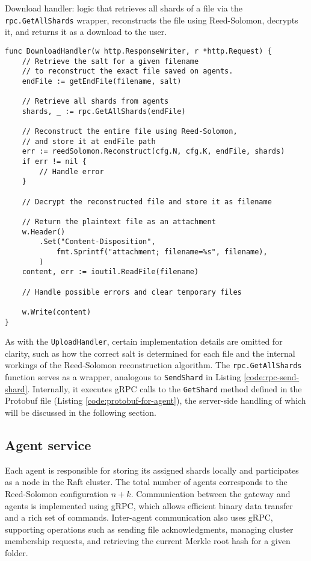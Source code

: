 \begin{listing}
\caption{Download handler: logic that retrieves all shards of a file via the \texttt{rpc.GetAllShards} wrapper, reconstructs the file using Reed-Solomon, decrypts it, and returns it as a download to the user.}
\label{code:download-handler}
\begin{verbatim}
func DownloadHandler(w http.ResponseWriter, r *http.Request) {
    // Retrieve the salt for a given filename 
    // to reconstruct the exact file saved on agents.
    endFile := getEndFile(filename, salt)

    // Retrieve all shards from agents
    shards, _ := rpc.GetAllShards(endFile)

    // Reconstruct the entire file using Reed-Solomon,
    // and store it at endFile path
    err := reedSolomon.Reconstruct(cfg.N, cfg.K, endFile, shards)
    if err != nil {
        // Handle error
    }

    // Decrypt the reconstructed file and store it as filename

    // Return the plaintext file as an attachment
    w.Header()
        .Set("Content-Disposition",
            fmt.Sprintf("attachment; filename=%s", filename),
        )
    content, err := ioutil.ReadFile(filename)

    // Handle possible errors and clear temporary files

    w.Write(content)
}
\end{verbatim}
\end{listing}

As with the \texttt{UploadHandler}, certain implementation details are omitted for clarity, such as how the correct salt is determined for each file and the internal workings of the Reed-Solomon reconstruction algorithm. The \texttt{rpc.GetAllShards} function serves as a wrapper, analogous to \texttt{SendShard} in Listing \ref{code:rpc-send-shard}. Internally, it executes gRPC calls to the \texttt{GetShard} method defined in the Protobuf file (Listing \ref{code:protobuf-for-agent}), the server-side handling of which will be discussed in the following section.

\newpage

\subsection{Agent service}

Each agent is responsible for storing its assigned shards locally and participates as a node in the Raft cluster. The total number of agents corresponds to the Reed-Solomon configuration $n+k$. Communication between the gateway and agents is implemented using gRPC, which allows efficient binary data transfer and a rich set of commands. Inter-agent communication also uses gRPC, supporting operations such as sending file acknowledgments, managing cluster membership requests, and retrieving the current Merkle root hash for a given folder.